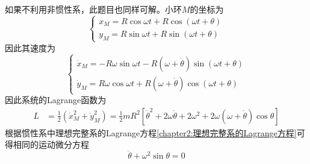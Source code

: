\begin{solution}
如果不利用非惯性系，此题目也同样可解。小环$M$的坐标为
\begin{equation*}
	\begin{cases}
		x_M = R\cos \omega t + R\cos (\omega t+\theta) \\
		y_M = R\sin \omega t + R\sin (\omega t+\theta)
	\end{cases}
\end{equation*}
因此其速度为
\begin{equation*}
	\begin{cases}
		\dot{x}_M = -R\omega \sin \omega t - R(\omega + \dot{\theta}) \sin (\omega t+\theta) \\
		\dot{y}_M = R \omega \cos \omega t + R(\omega + \dot{\theta}) \cos (\omega t+\theta)
	\end{cases}
\end{equation*}
因此系统的Lagrange函数为
\begin{align*}
	L & = \frac12 (\dot{x}_M^2 + \dot{y}_M^2) = \frac12 mR^2 \left[\dot{\theta}^2 + 2\omega \dot{\theta} + 2\omega^2 + 2\omega(\omega+ \dot{\theta}) \cos \theta\right]
\end{align*}
根据惯性系中理想完整系的Lagrange方程\eqref{chapter2:理想完整系的Lagrange方程}可得相同的运动微分方程
\begin{equation*}
	\ddot{\theta} + \omega^2 \sin \theta = 0
\end{equation*}
\end{solution}

